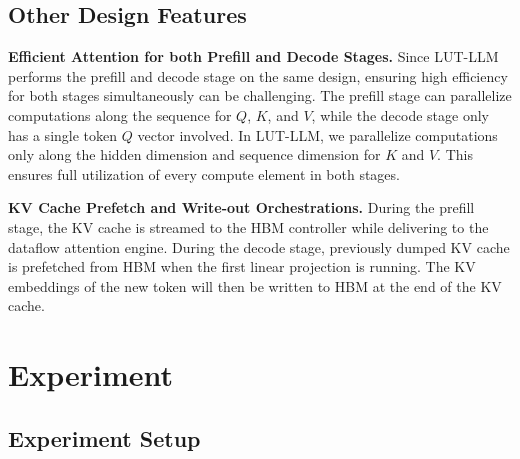 \documentclass[conference]{IEEEtran}
\begin{document}
\subsection{Other Design Features}

\noindent \textbf{Efficient Attention for both Prefill and Decode Stages.} Since LUT-LLM performs the prefill and decode stage on the same design, ensuring high efficiency for both stages simultaneously can be challenging. The prefill stage can parallelize computations along the sequence for $Q$, $K$, and $V$, while the decode stage only has a single token $Q$ vector involved. In LUT-LLM, we parallelize computations only along the hidden dimension and sequence dimension for $K$ and $V$. This ensures full utilization of every compute element in both stages.

\noindent \textbf{KV Cache Prefetch and Write-out Orchestrations.} During the prefill stage, the KV cache is streamed to the HBM controller while delivering to the dataflow attention engine. During the decode stage, previously dumped KV cache is prefetched from HBM when the first linear projection is running. The KV embeddings of the new token will then be written to HBM at the end of the KV cache. 

\section{Experiment}

\subsection{Experiment Setup}
\end{document}
